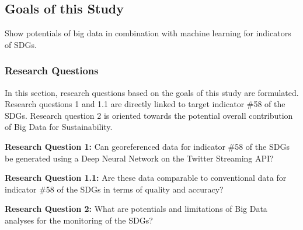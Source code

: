 			
			
		\subsection{Goals of this Study}
		
		Show potentials of big data in combination with machine learning for indicators of SDGs.
		
		
		
			\subsubsection{Research Questions}
			
			In this section, research questions based on the goals of this study are formulated. Research questions 1 and 1.1 are directly linked to target indicator \#58 of the SDGs. Research question 2 is oriented towards the potential overall contribution of Big Data for Sustainability.
			
			\bigskip
			
			\begin{tcolorbox}
				\textbf{Research Question 1:} \smallskip Can georeferenced data for indicator \#58 of the SDGs be generated using a Deep Neural Network on the Twitter Streaming API?
			\end{tcolorbox}
			
			\bigskip
				
				\begin{tcolorbox}
					\textbf{Research Question 1.1:} \smallskip Are these data comparable to conventional data for indicator \#58 of the SDGs in terms of quality and accuracy?
				\end{tcolorbox}
				
			\bigskip
				
				\begin{tcolorbox}
					\textbf{Research Question 2:} \smallskip What are potentials and limitations of Big Data analyses for the monitoring of the SDGs?
				\end{tcolorbox}

			\bigskip
				
	
			